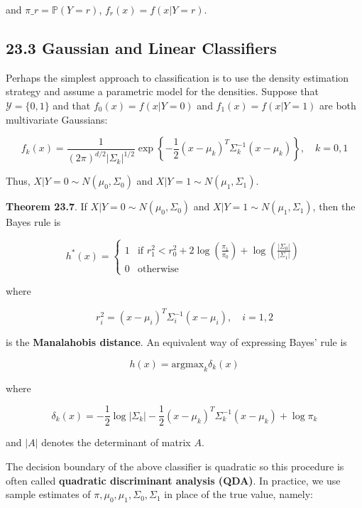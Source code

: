 and $ \pi\_r = \mathbb{P}(Y = r)$, \(f_r(x) = f(x | Y = r)\).

\subsection*{23.3 Gaussian and Linear Classifiers}\label{gaussian-and-linear-classifiers}

Perhaps the simplest approach to classification is to use the density
estimation strategy and assume a parametric model for the densities.
Suppose that \(\mathcal{Y} = \{ 0, 1 \}\) and that
\(f_{0}(x) = f(x | Y = 0)\) and \(f_{1}(x) = f(x | Y = 1)\) are both
multivariate Gaussians:

\[ f_{k}(x) = \frac{1}{(2\pi)^{d/2} | \Sigma_{k} |^{1/2}} \exp \left\{ -\frac{1}{2} (x - \mu_{k})^T \Sigma_{k}^{-1} (x - \mu_{k}) \right\}, \quad k = 0, 1\]

Thus, \(X | Y = 0 \sim N(\mu_{0}, \Sigma_{0})\) and
\(X | Y = 1 \sim N(\mu_{1}, \Sigma_{1})\).

\textbf{Theorem 23.7}. If \(X | Y = 0 \sim N(\mu_{0}, \Sigma_{0})\) and
\(X | Y = 1 \sim N(\mu_{1}, \Sigma_{1})\), then the Bayes rule is

\[
h^*(x) = \begin{cases}
1 & \text{if } r_{1}^{2} < r_{0}^{2} + 2 \log \left( \frac{\pi_{1}}{\pi_{0}} \right) + \log \left( \frac{| \Sigma_{0} | }{ | \Sigma_{1}| }
\right) \\
0 & \text{otherwise} 
\end{cases}
\]

where

\[ r_{i}^{2} = (x - \mu_{i})^T \Sigma_{i}^{-1}(x - \mu_{i}), \quad i = 1, 2 \]

is the \textbf{Manalahobis distance}. An equivalent way of expressing
Bayes' rule is

\[ h(x) = \text{argmax}_{k} \delta_{k}(x) \]

where

\[ \delta_{k}(x) = -\frac{1}{2} \log | \Sigma_{k} | - \frac{1}{2} (x - \mu_{k})^T \Sigma_{k}^{-1} (x - \mu_{k}) + \log \pi_{k} \]

and \(|A|\) denotes the determinant of matrix \(A\).

The decision boundary of the above classifier is quadratic so this
procedure is often called \textbf{quadratic discriminant analysis
(QDA)}. In practice, we use sample estimates of
\(\pi, \mu_{0}, \mu_{1}, \Sigma_{0}, \Sigma_{1}\) in place of the true value,
namely:

